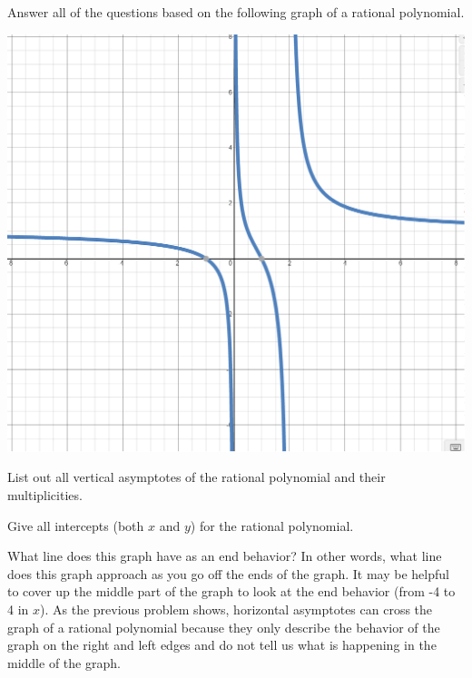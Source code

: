 \bq Answer all of the questions based on the following graph of a rational polynomial.
\begin{center} \includegraphics[scale=.45]{r1.png} \end{center}
\be
\item List out all vertical asymptotes of the rational polynomial and their multiplicities.
\item Give all intercepts (both $x$ and $y$) for the rational polynomial.
\item What line does this graph have as an end behavior? In other words, what line does this graph approach as you go off the ends of the graph. It may be helpful to cover up the middle part of the graph to look at the end behavior (from -4 to 4 in $x$).
\ee
\eq
As the previous problem shows, horizontal asymptotes can cross the graph of a rational polynomial because they only describe the behavior of the graph on the right and left edges and do not tell us what is happening in the middle of the graph.

